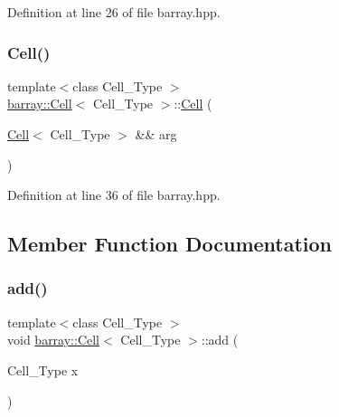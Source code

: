 Definition at line 26 of file barray.\+hpp.

\mbox{\label{classbarray_1_1_cell_a1882c43e6e545687938c324eeebd6c89}} 
\subsubsection{\texorpdfstring{Cell()}{Cell()}\hspace{0.1cm}{\footnotesize\ttfamily [6/6]}}
{\footnotesize\ttfamily template$<$class Cell\+\_\+\+Type $>$ \\
\hyperlink{classbarray_1_1_cell}{barray\+::\+Cell}$<$ Cell\+\_\+\+Type $>$\+::\hyperlink{classbarray_1_1_cell}{Cell} (\begin{DoxyParamCaption}\item[{\hyperlink{classbarray_1_1_cell}{Cell}$<$ Cell\+\_\+\+Type $>$ \&\&}]{arg }\end{DoxyParamCaption})\hspace{0.3cm}{\ttfamily [inline]}}



Definition at line 36 of file barray.\+hpp.



\subsection{Member Function Documentation}
\mbox{\label{classbarray_1_1_cell_ac6bc03bcee187b59b1f97e55d2be9e84}} 
\subsubsection{\texorpdfstring{add()}{add()}}
{\footnotesize\ttfamily template$<$class Cell\+\_\+\+Type $>$ \\
void \hyperlink{classbarray_1_1_cell}{barray\+::\+Cell}$<$ Cell\+\_\+\+Type $>$\+::add (\begin{DoxyParamCaption}\item[{Cell\+\_\+\+Type}]{x }\end{DoxyParamCaption})}

\mbox{\label{classbarray_1_1_cell_a728519773feadec5fec6fb0606642552}} 
